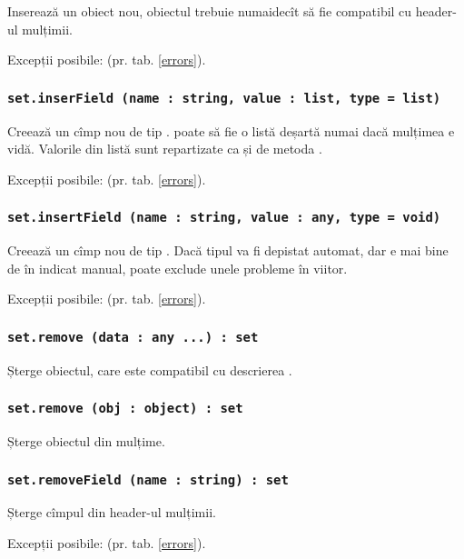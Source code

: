 Inserează un obiect nou, obiectul  trebuie numaidecît să fie compatibil cu header-ul mulțimii.

Excepții posibile:  (pr. tab. \ref{errors}).

\subsubsection{\lstinline|set.inserField (name : string, value : list, type = list)|}

Creează un cîmp nou de tip .  poate să fie o listă deșartă numai dacă mulțimea e vidă. Valorile din listă sunt repartizate ca și de metoda .

Excepții posibile:  (pr. tab. \ref{errors}).

\subsubsection{\lstinline|set.insertField (name : string, value : any, type = void)|}

Creează un cîmp nou de tip . Dacă  tipul va fi depistat automat, dar e mai bine de în indicat manual, poate exclude unele probleme în viitor.

Excepții posibile:  (pr. tab. \ref{errors}).

\subsubsection{\lstinline|set.remove (data : any ...) : set|}

Șterge obiectul, care este compatibil cu descrierea .

\subsubsection{\lstinline|set.remove (obj : object) : set|}

Șterge obiectul  din mulțime.

\subsubsection{\lstinline|set.removeField (name : string) : set|}

Șterge cîmpul  din header-ul mulțimii.

Excepții posibile:  (pr. tab. \ref{errors}).

